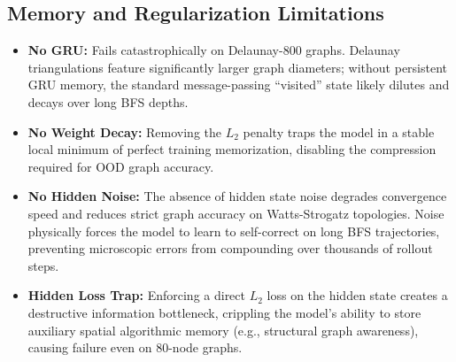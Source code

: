 \documentclass{article}
\begin{document}
\subsection{Memory and Regularization Limitations}
\begin{itemize}
    \item \textbf{No GRU:} Fails catastrophically on Delaunay-800 graphs. Delaunay triangulations feature significantly larger graph diameters; without persistent GRU memory, the standard message-passing ``visited'' state likely dilutes and decays over long BFS depths.
    \item \textbf{No Weight Decay:} Removing the $L_2$ penalty traps the model in a stable local minimum of perfect training memorization, disabling the compression required for OOD graph accuracy.
    \item \textbf{No Hidden Noise:} The absence of hidden state noise degrades convergence speed and reduces strict graph accuracy on Watts-Strogatz topologies. Noise physically forces the model to learn to self-correct on long BFS trajectories, preventing microscopic errors from compounding over thousands of rollout steps.
    \item \textbf{Hidden Loss Trap:} Enforcing a direct $L_2$ loss on the hidden state creates a destructive information bottleneck, crippling the model's ability to store auxiliary spatial algorithmic memory (e.g., structural graph awareness), causing failure even on 80-node graphs.
\end{itemize}
\end{document}
